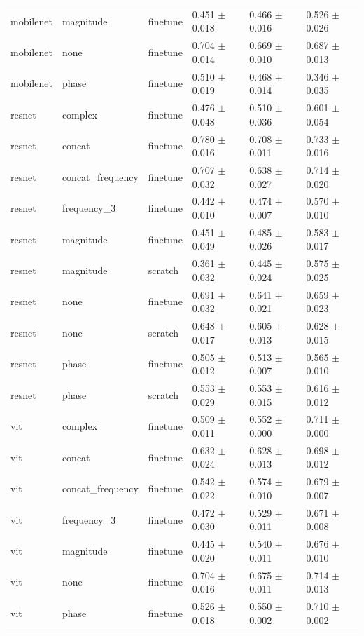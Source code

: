 \begin{table}
\begin{tabular}{llllll}
mobilenet & magnitude & finetune & 0.451 $\pm$ 0.018 & 0.466 $\pm$ 0.016 & 0.526 $\pm$ 0.026 \\
mobilenet & none & finetune & 0.704 $\pm$ 0.014 & 0.669 $\pm$ 0.010 & 0.687 $\pm$ 0.013 \\
mobilenet & phase & finetune & 0.510 $\pm$ 0.019 & 0.468 $\pm$ 0.014 & 0.346 $\pm$ 0.035 \\
resnet & complex & finetune & 0.476 $\pm$ 0.048 & 0.510 $\pm$ 0.036 & 0.601 $\pm$ 0.054 \\
resnet & concat & finetune & 0.780 $\pm$ 0.016 & 0.708 $\pm$ 0.011 & 0.733 $\pm$ 0.016 \\
resnet & concat_frequency & finetune & 0.707 $\pm$ 0.032 & 0.638 $\pm$ 0.027 & 0.714 $\pm$ 0.020 \\
resnet & frequency_3 & finetune & 0.442 $\pm$ 0.010 & 0.474 $\pm$ 0.007 & 0.570 $\pm$ 0.010 \\
resnet & magnitude & finetune & 0.451 $\pm$ 0.049 & 0.485 $\pm$ 0.026 & 0.583 $\pm$ 0.017 \\
resnet & magnitude & scratch & 0.361 $\pm$ 0.032 & 0.445 $\pm$ 0.024 & 0.575 $\pm$ 0.025 \\
resnet & none & finetune & 0.691 $\pm$ 0.032 & 0.641 $\pm$ 0.021 & 0.659 $\pm$ 0.023 \\
resnet & none & scratch & 0.648 $\pm$ 0.017 & 0.605 $\pm$ 0.013 & 0.628 $\pm$ 0.015 \\
resnet & phase & finetune & 0.505 $\pm$ 0.012 & 0.513 $\pm$ 0.007 & 0.565 $\pm$ 0.010 \\
resnet & phase & scratch & 0.553 $\pm$ 0.029 & 0.553 $\pm$ 0.015 & 0.616 $\pm$ 0.012 \\
vit & complex & finetune & 0.509 $\pm$ 0.011 & 0.552 $\pm$ 0.000 & 0.711 $\pm$ 0.000 \\
vit & concat & finetune & 0.632 $\pm$ 0.024 & 0.628 $\pm$ 0.013 & 0.698 $\pm$ 0.012 \\
vit & concat_frequency & finetune & 0.542 $\pm$ 0.022 & 0.574 $\pm$ 0.010 & 0.679 $\pm$ 0.007 \\
vit & frequency_3 & finetune & 0.472 $\pm$ 0.030 & 0.529 $\pm$ 0.011 & 0.671 $\pm$ 0.008 \\
vit & magnitude & finetune & 0.445 $\pm$ 0.020 & 0.540 $\pm$ 0.011 & 0.676 $\pm$ 0.010 \\
vit & none & finetune & 0.704 $\pm$ 0.016 & 0.675 $\pm$ 0.011 & 0.714 $\pm$ 0.013 \\
vit & phase & finetune & 0.526 $\pm$ 0.018 & 0.550 $\pm$ 0.002 & 0.710 $\pm$ 0.002 \\

\end{tabular}
\end{table}
